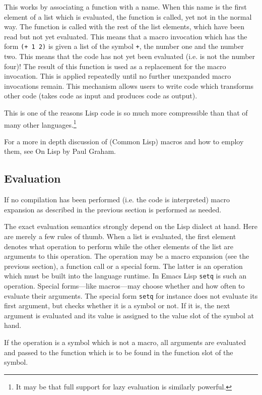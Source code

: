 \documentclass[a4paper,10pt,twoside]{report}
\newcommand{\el}{Emacs Lisp}
\newcommand{\cl}{Common Lisp}
\newcommand{\sym}[1]{\texttt{#1}}
\newcommand{\fun}[1]{\texttt{#1}}
\begin{document}
This works by associating a function with a name.  When this name is the first
element of a list which is evaluated, the function is called, yet not in the
normal way.  The function is called with the rest of the list elements, which
have been read but not yet evaluated.  This means that a macro invocation which
has the form \texttt{(+ 1 2)} is given a list of the symbol \sym{+}, the number
one and the number two.  This means that the code has not yet been evaluated
(i.e. is not the number four)!  The result of this function is used as a
replacement for the macro invocation.  This is applied repeatedly until no
further unexpanded macro invocations remain.  This mechanism allows users to
write code which transforms other code (takes code as input and produces code as
output).

This is one of the reasons Lisp code is so much more compressible than that of
many other languages.\footnote{It may be that full support for lazy evaluation
  is similarly powerful.}

For a more in depth discussion of (\cl{}) macros and how to employ them, see On
Lisp by Paul Graham.\cite{on-lisp}

\subsection{Evaluation}
\label{subsec:evaluation}

If no compilation has been performed (i.e. the code is interpreted) macro
expansion as described in the previous section is performed as needed.

The exact evaluation semantics strongly depend on the Lisp dialect at hand.
Here are merely a few rules of thumb.  When a list is evaluated, the first
element denotes what operation to perform while the other elements of the list
are arguments to this operation.  The operation may be a macro expansion (see
the previous section), a function call or a special form.  The latter is an
operation which must be built into the language runtime.  In \el{} \fun{setq} is
such an operation.  Special forms---like macros---may choose whether and how
often to evaluate their arguments.  The special form \fun{setq} for instance
does not evaluate its first argument, but checks whether it is a symbol or not.
If it is, the next argument is evaluated and its value is assigned to the value
slot of the symbol at hand.

If the operation is a symbol which is not a macro, all arguments are evaluated
and passed to the function which is to be found in the function slot of the
symbol.
\end{document}
